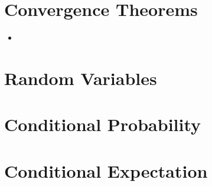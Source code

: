 \documentclass[10pt]{article}
\begin{document}
\section{Convergence Theorems}

\begin{itemize}
  \item  
\end{itemize}

\section{Random Variables}

\section{Conditional Probability}

\section{Conditional Expectation}


  
\end{document}
